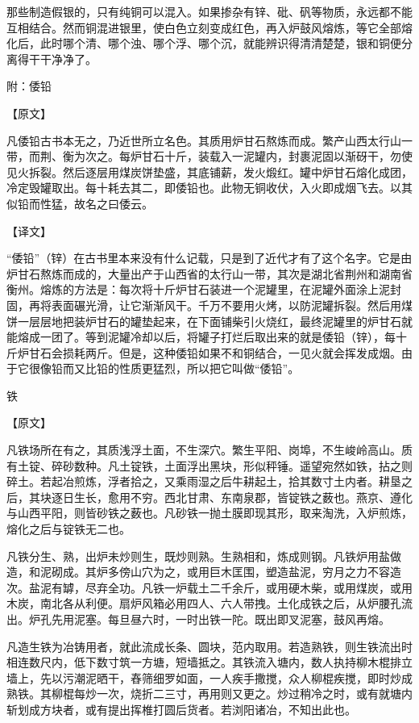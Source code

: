 \documentclass[12pt,UTF8]{ctexbook}
\begin{document}
那些制造假银的，只有纯铜可以混入。如果掺杂有锌、砒、矾等物质，永远都不能互相结合。然而铜混进银里，使白色立刻变成红色，再入炉鼓风熔炼，等它全部熔化后，此时哪个清、哪个浊、哪个浮、哪个沉，就能辨识得清清楚楚，银和铜便分离得干干净净了。

附：倭铅

【原文】

凡倭铅古书本无之，乃近世所立名色。其质用炉甘石熬炼而成。繁产山西太行山一带，而荆、衡为次之。每炉甘石十斤，装载入一泥罐内，封裹泥固以渐砑干，勿使见火拆裂。然后逐层用煤炭饼垫盛，其底铺薪，发火煅红。罐中炉甘石熔化成团，冷定毁罐取出。每十耗去其二，即倭铅也。此物无铜收伏，入火即成烟飞去。以其似铅而性猛，故名之曰倭云。

【译文】

“倭铅”（锌）在古书里本来没有什么记载，只是到了近代才有了这个名字。它是由炉甘石熬炼而成的，大量出产于山西省的太行山一带，其次是湖北省荆州和湖南省衡州。熔炼的方法是：每次将十斤炉甘石装进一个泥罐里，在泥罐外面涂上泥封固，再将表面碾光滑，让它渐渐风干。千万不要用火烤，以防泥罐拆裂。然后用煤饼一层层地把装炉甘石的罐垫起来，在下面铺柴引火烧红，最终泥罐里的炉甘石就能熔成一团了。等到泥罐冷却以后，将罐子打烂后取出来的就是倭铅（锌），每十斤炉甘石会损耗两斤。但是，这种倭铅如果不和铜结合，一见火就会挥发成烟。由于它很像铅而又比铅的性质更猛烈，所以把它叫做“倭铅”。

铁

【原文】

凡铁场所在有之，其质浅浮土面，不生深穴。繁生平阳、岗埠，不生峻岭高山。质有土锭、碎砂数种。凡土锭铁，土面浮出黑块，形似秤锤。遥望宛然如铁，拈之则碎土。若起冶煎炼，浮者拾之，又乘雨湿之后牛耕起土，拾其数寸土内者。耕垦之后，其块逐日生长，愈用不穷。西北甘肃、东南泉郡，皆锭铁之薮也。燕京、遵化与山西平阳，则皆砂铁之薮也。凡砂铁一抛土膜即现其形，取来淘洗，入炉煎炼，熔化之后与锭铁无二也。

凡铁分生、熟，出炉未炒则生，既炒则熟。生熟相和，炼成则钢。凡铁炉用盐做造，和泥砌成。其炉多傍山穴为之，或用巨木匡围，塑造盐泥，穷月之力不容造次。盐泥有罅，尽弃全功。凡铁一炉载土二千余斤，或用硬木柴，或用煤炭，或用木炭，南北各从利便。扇炉风箱必用四人、六人带拽。土化成铁之后，从炉腰孔流出。炉孔先用泥塞。每旦昼六时，一时出铁一陀。既出即叉泥塞，鼓风再熔。

凡造生铁为冶铸用者，就此流成长条、圆块，范内取用。若造熟铁，则生铁流出时相连数尺内，低下数寸筑一方塘，短墙抵之。其铁流入塘内，数人执持柳木棍排立墙上，先以污潮泥晒干，舂筛细罗如面，一人疾手撒搅，众人柳棍疾搅，即时炒成熟铁。其柳棍每炒一次，烧折二三寸，再用则又更之。炒过稍冷之时，或有就塘内斩划成方块者，或有提出挥椎打圆后货者。若浏阳诸冶，不知出此也。
\end{document}

